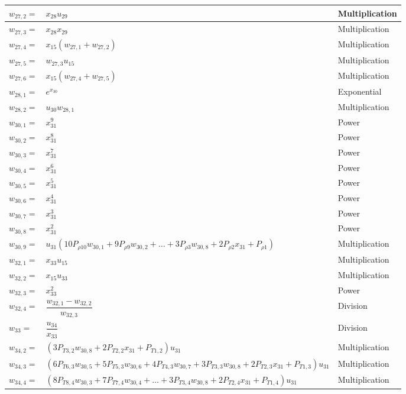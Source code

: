 \begin{longtable}{|p{1.5cm}|l|p{2cm}|}
$w_{27,2}=$ & $ x_{28}u_{29} $ & Multiplication \\ \hline
$w_{27,3}=$ & $ x_{28}x_{29} $ & Multiplication \\ \hline
$w_{27,4}=$ & $ x_{15}\left(w_{27,1}+w_{27,2}\right) $ & Multiplication \\ \hline
$w_{27,5}=$ & $ w_{27,3}u_{15} $ & Multiplication \\ \hline
$w_{27,6}=$ & $ x_{15}\left(w_{27,4}+w_{27,5}\right) $ & Multiplication \\ \hline 
$w_{28,1}=$ & $ e^{x_{30}} $ & Exponential \\ \hline
$w_{28,2}=$ & $ u_{30}w_{28,1} $ & Multiplication \\ \hline
$w_{30,1}=$ & $ x_{31}^{9} $ & Power \\ \hline
$w_{30,2}=$ & $ x_{31}^{8} $ & Power \\ \hline
$w_{30,3}=$ & $ x_{31}^{7} $ & Power \\ \hline
$w_{30,4}=$ & $ x_{31}^{6} $ & Power \\ \hline
$w_{30,5}=$ & $ x_{31}^{5} $ & Power \\ \hline
$w_{30,6}=$ & $ x_{31}^{4} $ & Power \\ \hline
$w_{30,7}=$ & $ x_{31}^{3} $ & Power \\ \hline
$w_{30,8}=$ & $ x_{31}^{2} $ & Power \\ \hline
$w_{30,9}=$ & $ u_{31}\left(10 P_{\rho 10}w_{30,1}+9 P_{\rho 9}w_{30,2}+\dots+3 P_{\rho 3}w_{30,8}+2 P_{\rho 2}x_{31}+P_{\rho 1}\right) $ & Multiplication \\ \hline
$w_{32,1}=$ & $ x_{33}u_{15} $ & Multiplication \\ \hline
$w_{32,2}=$ & $ x_{15}u_{33} $ & Multiplication \\ \hline
$w_{32,3}=$ & $ x_{33}^{2} $ & Power \\ \hline
$w_{32,4}=$ & $ \dfrac{w_{32,1}-w_{32,2}}{w_{32,3}} $ & Division \\ \hline
$w_{33}=$ & $ \dfrac{u_{34}}{x_{33}} $ & Division \\ \hline
$w_{34,2}=$ & $ \left(3P_{T 3,2}w_{30,8}+2P_{T 2,2}x_{31}+P_{T 1,2}\right)u_{31} $ & Multiplication \\ \hline
$w_{34,3}=$ & $ \left(6 P_{T 6,3}w_{30,5}+5P_{T 5,3}w_{30,6}+4P_{T 4,3}w_{30,7}+3P_{T 3,3}w_{30,8}+2P_{T 2,3}x_{31}+P_{T 1,3}\right)u_{31} $ & Multiplication \\ \hline
$w_{34,4}=$ & $ \left(8 P_{T 8,4}w_{30,3}+7P_{T 7,4}w_{30,4}+\dots+3P_{T 3,4}w_{30,8}+2P_{T 2,4}x_{31}+P_{T 1,4}\right)u_{31} $ & Multiplication \\ \hline

\end{longtable}
